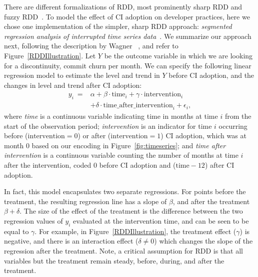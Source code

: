
There are different formalizations of RDD, most prominently 
sharp RDD and fuzzy RDD~\cite{imbens2008regression}.
To model the effect of CI adoption on developer practices, here we chose one 
implementation of the simpler, sharp RDD approach: \emph{segmented regression 
analysis of interrupted time series data}~\cite{wagner2002segmented}.
We summarize our approach next, following the description by Wagner 
\etal~\cite{wagner2002segmented}, and refer to Figure~\ref{RDDIllustration}.
Let $Y$ be the outcome variable in which we are looking for a discontinuity, 
\eg commit churn per month.
We can specify the following linear regression model to estimate the level
and trend in $Y$ before CI adoption, and the changes in level and trend
after CI adoption:
\begin{align}
y_i \ = &\alpha + \beta \cdot \text{time}_i + \gamma \cdot \text{intervention}_i \nonumber \\
	&+ \delta \cdot \text{time\_after\_intervention}_i + \epsilon_i,
\end{align}
where \emph{time} is a continuous variable indicating time in months at 
time $i$ from the start of the observation period;
\emph{intervention} is an indicator for time $i$ occurring before 
($\text{intervention} = 0$) or after ($\text{intervention} = 1$) CI adoption, which 
was at month 0 based on our encoding in Figure~\ref{fig:timeseries};
and \emph{time after intervention} is a continuous variable counting the number 
of months at time $i$ after the intervention, coded 0 before CI adoption and 
($\text{time} - 12$) after CI adoption.


In fact, this model encapsulates two separate regressions.
For points before the treatment, the resulting regression line has a slope of 
$\beta$, and after the treatment $\beta + \delta$.
The size of the effect of the treatment is the difference between the two 
regression values of $y_i$ evaluated at the intervention time,
and can be seen to be equal to $\gamma$.
For example, in Figure~\ref{RDDIllustration}, the treatment effect ($\gamma$) 
is negative, and there is an interaction effect ($\delta \neq 0$) which changes 
the slope of the regression after the treatment.
Note, a critical assumption for RDD is that all variables but the treatment
remain steady, before, during, and after the treatment.

